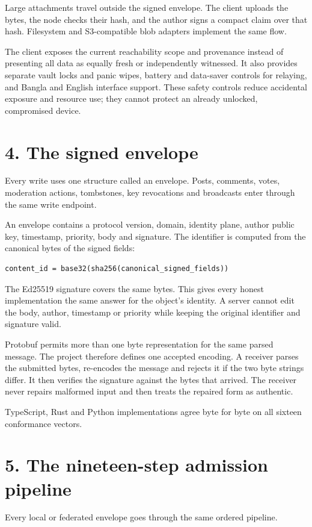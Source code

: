 \documentclass[12pt,a4paper]{article}
\begin{document}
Large attachments travel outside the signed envelope. The client uploads the bytes, the node checks their hash, and the author signs a compact claim over that hash. Filesystem and S3-compatible blob adapters implement the same flow.

The client exposes the current reachability scope and provenance instead of presenting all data as equally fresh or independently witnessed. It also provides separate vault locks and panic wipes, battery and data-saver controls for relaying, and Bangla and English interface support. These safety controls reduce accidental exposure and resource use; they cannot protect an already unlocked, compromised device.

\section*{4. The signed envelope}
Every write uses one structure called an envelope. Posts, comments, votes, moderation actions, tombstones, key revocations and broadcasts enter through the same write endpoint.

An envelope contains a protocol version, domain, identity plane, author public key, timestamp, priority, body and signature. The identifier is computed from the canonical bytes of the signed fields:

\begin{lstlisting}
content_id = base32(sha256(canonical_signed_fields))
\end{lstlisting}
The Ed25519 signature covers the same bytes. This gives every honest implementation the same answer for the object's identity. A server cannot edit the body, author, timestamp or priority while keeping the original identifier and signature valid.

Protobuf permits more than one byte representation for the same parsed message. The project therefore defines one accepted encoding. A receiver parses the submitted bytes, re-encodes the message and rejects it if the two byte strings differ. It then verifies the signature against the bytes that arrived. The receiver never repairs malformed input and then treats the repaired form as authentic.

TypeScript, Rust and Python implementations agree byte for byte on all sixteen conformance vectors.

\section*{5. The nineteen-step admission pipeline}
Every local or federated envelope goes through the same ordered pipeline.
\end{document}
